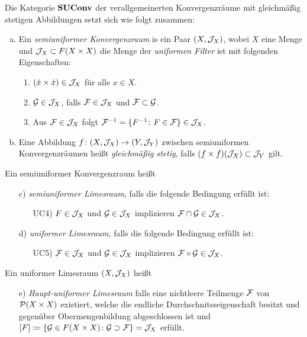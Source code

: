 \begin{defn}
  Die Kategorie $\mathbf{SUConv}$ der verallgemeinerten Konvergenzräume mit gleichmäßig stetigen Abbildungen setzt sich wie folgt zusammen:
  \begin{enumerate}[a)]
    \item Ein \emph{semiuniformer Konvergenzraum} is ein Paar $(X, \mathcal{J}_X)$, wobei $X$ eine Menge und $\mathcal{J}_X \subset F(X \times X)$ die Menge der \emph{uniformen Filter} ist mit folgenden Eigenschaften:
      \begin{enumerate}[UC1)]
         \item $(\dot x \times \dot x) \in \mathcal{J}_X$ für alle $x \in X$.
         \item $\mathcal{G} \in \mathcal{J}_X$, falls $\mathcal{F} \in \mathcal{J}_X$ und $\mathcal{F} \subset \mathcal{G}$.
         \item Aus $\mathcal{F} \in \mathcal{J}_X$ folgt $\mathcal{F}^{-1} = \{F^{-1} \colon F \in \mathcal{F}\} \in \mathcal{J}_X$.
      \end{enumerate}
    \item Eine Abbildung $f \colon (X, \mathcal{J}_X) \to (Y, \mathcal{J}_Y)$ zwischen semiuniformen Konvergenzräumen heißt \emph{gleichmäßig stetig}, falls $(f \times f)(\mathcal{J}_X) \subset \mathcal{J}_Y$ gilt.
  \end{enumerate}
  Ein semiuniformer Konvergenzraum heißt 
\begin{enumerate}[a)]
  \item[c)] \emph{semiuniformer Limesraum}, falls die folgende Bedingung erfüllt ist:
    \begin{enumerate}[UC1)]
      \item[UC4)] $F \in \mathcal{J}_X$ und $\mathcal{G} \in \mathcal{J}_X$ implizieren $\mathcal{F} \cap \mathcal{G} \in \mathcal{J}_X$.
    \end{enumerate}
  \item[d)] \emph{uniformer Limesraum}, falls die folgende Bedingung erfüllt ist:
    \begin{enumerate}[UC1)]
      \item[UC5)] $\mathcal{F} \in \mathcal{J}_X$ und $\mathcal{G} \in \mathcal{J}_X$ implizieren $\mathcal{F} \circ \mathcal{G} \in \mathcal{J}_X$.
    \end{enumerate}
  \end{enumerate}
  Ein uniformer Limesraum $(X, \mathcal{J}_X)$ heißt
  \begin{enumerate}[a)]
    \item[e)] \emph{Haupt-uniformer Limesraum} falls eine nichtleere Teilmenge $\mathcal{F}$ von $\mathcal{P}(X \times X)$ existiert, welche die endliche Durchschnitsseigenschaft besitzt und gegenüber Obermengenbildung abgeschlossen ist und $[F] \coloneqq \{\mathcal{G} \in F(X\times X) \colon \mathcal{G} \supset \mathcal{F} \}= \mathcal{J}_X$ erfüllt.
  \end{enumerate}
\end{defn}

